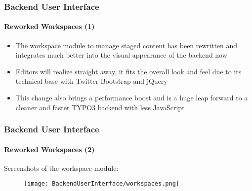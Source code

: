 \begin{frame}[fragile]
	\frametitle{Backend User Interface}
	\framesubtitle{Reworked Workspaces (1)}

	\begin{itemize}

		\item The workspace module to manage staged content has been rewritten and
			integrates much better into the visual appearance of the backend now

		\item Editors will realize straight away, it fits the overall look and feel
			due to its technical base with Twitter Bootstrap and jQuery

		\item This change also brings a performance boost and is a huge leap forward
			to a cleaner and faster TYPO3 backend with less JavaScript

	\end{itemize}

\end{frame}

\begin{frame}[fragile]
	\frametitle{Backend User Interface}
	\framesubtitle{Reworked Workspaces (2)}

	Screenshots of the workspace module:

	\begin{figure}
		\texttt{[image: BackendUserInterface/workspaces.png]}
	\end{figure}

\end{frame}

